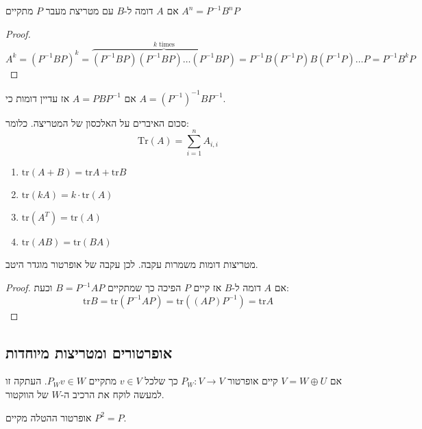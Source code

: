 \documentclass{tstextbook}
\begin{document}
\begin{proposition}
אם \(A\) דומה ל-\(B\) עם מטריצת מעבר \(P\) מתקיים \(A^{n}=P ^{-1} B^{n}P\)

\end{proposition}
\begin{proof}
$$A^{k}=(P ^{-1} B P)^{k}=\overbrace{ (P ^{-1}B P) (P ^{-1} B P)\dots (P ^{-1} B P) }^{ k\;\mathrm{ times} }= P ^{-1} B (P ^{-1} P) B (P ^{-1} P)\dots P=P ^{-1} B^{ k} P$$

\end{proof}
\begin{remark}
אם \(A=PBP ^{-1}\) אז עדיין דומות כי \(A=(P ^{-1})^{-1} B P ^{-1}\). 

\end{remark}
\begin{definition}[עקבה]
סכום האיברים על האלכסון של המטריצה. כלומר:
$$\mathrm{Tr}(A)=\sum_{i=1}^{n} A_{i,i}$$

\end{definition}
\begin{proposition}
  \begin{enumerate}
    \item \(\mathrm{tr}(A+B)=\mathrm{tr}A+\mathrm{tr}B\)


    \item \(\mathrm{tr}(k A)=k\cdot \mathrm{tr}(A)\)


    \item \(\mathrm{tr}(A^{T})=\mathrm{tr}(A)\)


    \item \(\mathrm{tr}(A B)=\mathrm{tr}(B A)\)


  \end{enumerate}
\end{proposition}
\begin{proposition}
מטריצות דומות משמרות עקבה. לכן עקבה של אופרטור מוגדר היטב.

\end{proposition}
\begin{proof}
אם \(A\) דומה ל-\(B\) אז קיים \(P\) הפיכה כך שמתקיים \(B=P ^{-1}A P\) וכעת:
$$\mathrm{tr}B=\mathrm{tr}(P^{-1}A P)=\mathrm{tr}((A P)P^{-1})=\mathrm{tr}A$$

\end{proof}
\subsection{אופרטורים ומטריצות מיוחדות}

\begin{definition}
אם \(V=W\oplus U\) קיים אופרטור \(P_{W}:V\to V\) כך שלכל \(v\in V\) מתקיים \(P_{W}v \in W\). העתקה זו למעשה לוקח את הרכיב ה-\(W\) של הווקטור.

\end{definition}
\begin{proposition}
אופרטור ההטלה מקיים \(P^{2}=P\).

\end{proposition}
\end{document}
